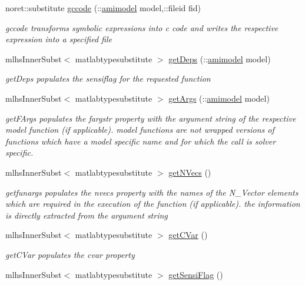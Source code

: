 \begin{DoxyCompactItemize}
noret\+::substitute \mbox{\hyperlink{classamifun_a05444f498e657a0010f6b539bc9c6596}{gccode}} (\+::\mbox{\hyperlink{classamimodel}{amimodel}} model,\+::fileid fid)
\begin{DoxyCompactList}\small\item\em gccode transforms symbolic expressions into c code and writes the respective expression into a specified file \end{DoxyCompactList}\item 
mlhs\+Inner\+Subst$<$ matlabtypesubstitute $>$ \mbox{\hyperlink{classamifun_a1cb97b695ab609e1655ec1067b140b70}{get\+Deps}} (\+::\mbox{\hyperlink{classamimodel}{amimodel}} model)
\begin{DoxyCompactList}\small\item\em get\+Deps populates the sensiflag for the requested function \end{DoxyCompactList}\item 
mlhs\+Inner\+Subst$<$ matlabtypesubstitute $>$ \mbox{\hyperlink{classamifun_a4b16e7670c0d60e530545e58628bde3f}{get\+Args}} (\+::\mbox{\hyperlink{classamimodel}{amimodel}} model)
\begin{DoxyCompactList}\small\item\em get\+F\+Args populates the fargstr property with the argument string of the respective model function (if applicable). model functions are not wrapped versions of functions which have a model specific name and for which the call is solver specific. \end{DoxyCompactList}\item 
mlhs\+Inner\+Subst$<$ matlabtypesubstitute $>$ \mbox{\hyperlink{classamifun_a3ae210044df5eb51e2f9280d03b86c3c}{get\+N\+Vecs}} ()
\begin{DoxyCompactList}\small\item\em getfunargs populates the nvecs property with the names of the N\+\_\+\+Vector elements which are required in the execution of the function (if applicable). the information is directly extracted from the argument string \end{DoxyCompactList}\item 
mlhs\+Inner\+Subst$<$ matlabtypesubstitute $>$ \mbox{\hyperlink{classamifun_a969775839d9d32ff4a0ba70395117ca7}{get\+C\+Var}} ()
\begin{DoxyCompactList}\small\item\em get\+C\+Var populates the cvar property \end{DoxyCompactList}\item 
mlhs\+Inner\+Subst$<$ matlabtypesubstitute $>$ \mbox{\hyperlink{classamifun_ac60147b051aa541057d0da18a78582a8}{get\+Sensi\+Flag}} ()

\end{DoxyCompactItemize}

